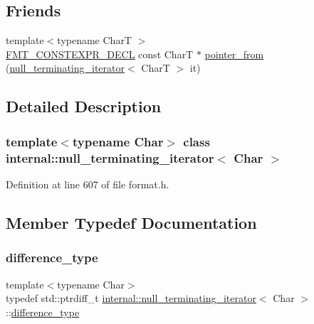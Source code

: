 \subsection*{Friends}
\begin{DoxyCompactItemize}
\item 
{\footnotesize template$<$typename CharT $>$ }\\\hyperlink{core_8h_af4388801466a5994a363d6005616371a}{F\+M\+T\+\_\+\+C\+O\+N\+S\+T\+E\+X\+P\+R\+\_\+\+D\+E\+CL} const CharT $\ast$ \hyperlink{classinternal_1_1null__terminating__iterator_a4c00a1495d35eaba6b67c8e0777e6234}{pointer\+\_\+from} (\hyperlink{classinternal_1_1null__terminating__iterator}{null\+\_\+terminating\+\_\+iterator}$<$ CharT $>$ it)
\end{DoxyCompactItemize}


\subsection{Detailed Description}
\subsubsection*{template$<$typename Char$>$\newline
class internal\+::null\+\_\+terminating\+\_\+iterator$<$ Char $>$}



Definition at line 607 of file format.\+h.



\subsection{Member Typedef Documentation}
\mbox{\label{classinternal_1_1null__terminating__iterator_ad1a2aa728f679bdfdbdc644f1c43e819}} 
\subsubsection{\texorpdfstring{difference\+\_\+type}{difference\_type}}
{\footnotesize\ttfamily template$<$typename Char$>$ \\
typedef std\+::ptrdiff\+\_\+t \hyperlink{classinternal_1_1null__terminating__iterator}{internal\+::null\+\_\+terminating\+\_\+iterator}$<$ Char $>$\+::\hyperlink{classinternal_1_1null__terminating__iterator_ad1a2aa728f679bdfdbdc644f1c43e819}{difference\+\_\+type}}



